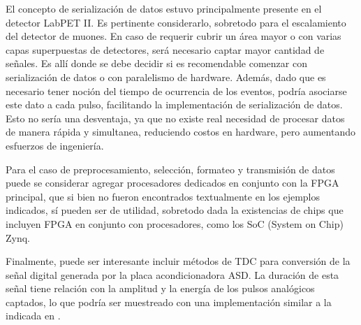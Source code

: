 	\par El concepto de serialización de datos estuvo principalmente presente en el detector LabPET II. Es pertinente considerarlo, sobretodo para el escalamiento del detector de muones. En caso de requerir cubrir un área mayor o con varias capas superpuestas de detectores, será necesario captar mayor cantidad de señales. Es allí donde se debe decidir si es recomendable comenzar con serialización de datos o con paralelismo de hardware. Además, dado que es necesario tener noción del tiempo de ocurrencia de los eventos, podría asociarse este dato a cada pulso, facilitando la implementación de serialización de datos. Esto no sería una desventaja, ya que no existe real necesidad de procesar datos de manera rápida y simultanea, reduciendo costos en hardware, pero aumentando esfuerzos de ingeniería.
	
	\par Para el caso de preprocesamiento, selección, formateo y transmisión de datos puede se considerar agregar procesadores dedicados en conjunto con la FPGA principal, que si bien no fueron encontrados textualmente en los ejemplos indicados, sí pueden ser de utilidad, sobretodo dada la existencias de chips que incluyen FPGA en conjunto con procesadores, como los SoC (System on Chip) Zynq.
	
	\par Finalmente, puede ser interesante incluir métodos de TDC para conversión de la señal digital generada por la placa acondicionadora ASD. La duración de esta señal tiene relación con la amplitud y la energía de los pulsos analógicos captados, lo que podría ser muestreado con una implementación similar a la indicada en \cite{Arpin2010AResources}.
	